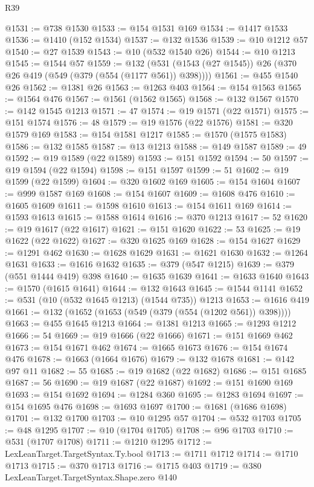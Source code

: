 \begin{lexlean}{R39}
\begin{coremodule}
@1531 := @738 @1530
@1533 := @154 @1531 @169
@1534 := @1417 @1533
@1536 := @1410 (@152 @1534)
@1537 := @132 @1536
@1539 := @10 @1212 @57
@1540 := @27 @1539
@1543 := @10 (@532 @1540 @26)
@1544 := @10 @1213
@1545 := @1544 @57
@1559 := @132 (@531 (@1543 (@27 @1545)) @26 (@370 @26 @419 (@549 (@379 (@554 (@1177 @561)) @398))))
@1561 := @455 @1540 @26
@1562 := @1381 @26
@1563 := @1263 @403
@1564 := @154 @1563
@1565 := @1564 @476
@1567 := @1561 (@1562 @1565)
@1568 := @132 @1567
@1570 := @142 @1545 @1213
@1571 := 47
@1574 := @19 @1571 (@22 @1571)
@1575 := @151 @1574
@1576 := 48
@1579 := @19 @1576 (@22 @1576)
@1581 := @320 @1579 @169
@1583 := @154 @1581 @1217
@1585 := @1570 (@1575 @1583)
@1586 := @132 @1585
@1587 := @13 @1213
@1588 := @149 @1587
@1589 := 49
@1592 := @19 @1589 (@22 @1589)
@1593 := @151 @1592
@1594 := 50
@1597 := @19 @1594 (@22 @1594)
@1598 := @151 @1597
@1599 := 51
@1602 := @19 @1599 (@22 @1599)
@1604 := @320 @1602 @169
@1605 := @154 @1604
@1607 := @999 @1587 @169
@1608 := @154 @1607
@1609 := @1608 @476
@1610 := @1605 @1609
@1611 := @1598 @1610
@1613 := @154 @1611 @169
@1614 := @1593 @1613
@1615 := @1588 @1614
@1616 := @370 @1213
@1617 := 52
@1620 := @19 @1617 (@22 @1617)
@1621 := @151 @1620
@1622 := 53
@1625 := @19 @1622 (@22 @1622)
@1627 := @320 @1625 @169
@1628 := @154 @1627
@1629 := @1291 @462
@1630 := @1628 @1629
@1631 := @1621 @1630
@1632 := @1264 @1631
@1633 := @1616 @1632
@1635 := @379 (@547 @1215)
@1639 := @379 (@551 @1444 @419) @398
@1640 := @1635 @1639
@1641 := @1633 @1640
@1643 := @1570 (@1615 @1641)
@1644 := @132 @1643
@1645 := @1544 @1141
@1652 := @531 (@10 (@532 @1645 @1213) (@1544 @735)) @1213
@1653 := @1616 @419
@1661 := @132 (@1652 (@1653 (@549 (@379 (@554 (@1202 @561)) @398))))
@1663 := @455 @1645 @1213
@1664 := @1381 @1213
@1665 := @1293 @1212
@1666 := 54
@1669 := @19 @1666 (@22 @1666)
@1671 := @151 @1669 @462
@1673 := @154 @1671 @462
@1674 := @1665 @1673
@1676 := @154 @1674 @476
@1678 := @1663 (@1664 @1676)
@1679 := @132 @1678
@1681 := @142 @97 @11
@1682 := 55
@1685 := @19 @1682 (@22 @1682)
@1686 := @151 @1685
@1687 := 56
@1690 := @19 @1687 (@22 @1687)
@1692 := @151 @1690 @169
@1693 := @154 @1692
@1694 := @1284 @360
@1695 := @1283 @1694
@1697 := @154 @1695 @476
@1698 := @1693 @1697
@1700 := @1681 (@1686 @1698)
@1701 := @132 @1700
@1703 := @10 @1295 @57
@1704 := @532 @1703
@1705 := @48 @1295
@1707 := @10 (@1704 @1705)
@1708 := @96 @1703
@1710 := @531 (@1707 @1708)
@1711 := @1210 @1295
@1712 := LexLeanTarget.TargetSyntax.Ty.bool
@1713 := @1711 @1712
@1714 := @1710 @1713
@1715 := @370 @1713
@1716 := @1715 @403
@1719 := @380 LexLeanTarget.TargetSyntax.Shape.zero @140

\end{coremodule}
\end{lexlean}
